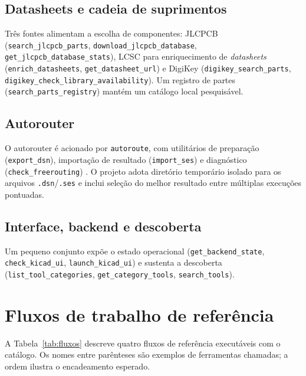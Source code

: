 \subsection{Datasheets e cadeia de suprimentos}

Três fontes alimentam a escolha de componentes: JLCPCB
(\texttt{search\_jlcpcb\_parts}, \texttt{download\_jlcpcb\_database},
\texttt{get\_jlcpcb\_database\_stats}), LCSC para enriquecimento de
\emph{datasheets} (\texttt{enrich\_datasheets}, \texttt{get\_datasheet\_url})
e DigiKey (\texttt{digikey\_search\_parts},
\texttt{digikey\_check\_library\_availability}). Um registro de partes
(\texttt{search\_parts\_registry}) mantém um catálogo local pesquisável.

\subsection{Autorouter}

O autorouter é acionado por \texttt{autoroute}, com utilitários de preparação
(\texttt{export\_dsn}), importação de resultado (\texttt{import\_ses}) e
diagnóstico (\texttt{check\_freerouting}) \citep{freerouting}. O projeto
adota diretório temporário isolado para os arquivos \texttt{.dsn}/\texttt{.ses}
e inclui seleção do melhor resultado entre múltiplas execuções pontuadas.

\subsection{Interface, backend e descoberta}

Um pequeno conjunto expõe o estado operacional
(\texttt{get\_backend\_state}, \texttt{check\_kicad\_ui},
\texttt{launch\_kicad\_ui}) e sustenta a descoberta
(\texttt{list\_tool\_categories}, \texttt{get\_category\_tools},
\texttt{search\_tools}).

\section{Fluxos de trabalho de referência}

A Tabela~\ref{tab:fluxos} descreve quatro fluxos de referência executáveis
com o catálogo. Os nomes entre parênteses são exemplos de ferramentas
chamadas; a ordem ilustra o encadeamento esperado.

